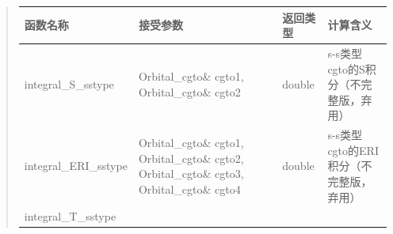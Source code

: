 \documentclass[11pt]{article}
\begin{document}
\begin{quote}
\begin{longtable}[]{@{}llll@{}}
\toprule
\begin{minipage}[b]{0.17\columnwidth}\raggedright\strut
函数名称\strut
\end{minipage} & \begin{minipage}[b]{0.37\columnwidth}\raggedright\strut
接受参数\strut
\end{minipage} & \begin{minipage}[b]{0.07\columnwidth}\raggedright\strut
返回类型\strut
\end{minipage} & \begin{minipage}[b]{0.27\columnwidth}\raggedright\strut
计算含义\strut
\end{minipage}\tabularnewline
\midrule
\endhead
\begin{minipage}[t]{0.17\columnwidth}\raggedright\strut
integral\_S\_sstype\strut
\end{minipage} & \begin{minipage}[t]{0.37\columnwidth}\raggedright\strut
Orbital\_cgto\& cgto1, Orbital\_cgto\& cgto2\strut
\end{minipage} & \begin{minipage}[t]{0.07\columnwidth}\raggedright\strut
double\strut
\end{minipage} & \begin{minipage}[t]{0.27\columnwidth}\raggedright\strut
s-s类型cgto的S积分（不完整版，弃用）\strut
\end{minipage}\tabularnewline
\begin{minipage}[t]{0.17\columnwidth}\raggedright\strut
integral\_ERI\_sstype\strut
\end{minipage} & \begin{minipage}[t]{0.37\columnwidth}\raggedright\strut
Orbital\_cgto\& cgto1, Orbital\_cgto\& cgto2, Orbital\_cgto\& cgto3,
Orbital\_cgto\& cgto4\strut
\end{minipage} & \begin{minipage}[t]{0.07\columnwidth}\raggedright\strut
double\strut
\end{minipage} & \begin{minipage}[t]{0.27\columnwidth}\raggedright\strut
s-s类型cgto的ERI积分（不完整版，弃用）\strut
\end{minipage}\tabularnewline
\begin{minipage}[t]{0.17\columnwidth}\raggedright\strut
integral\_T\_sstype\strut
\end{minipage} & \begin{minipage}[t]{0.37\columnwidth}\raggedright\strut

\end{minipage}
\end{longtable}
\end{quote}
\end{document}
